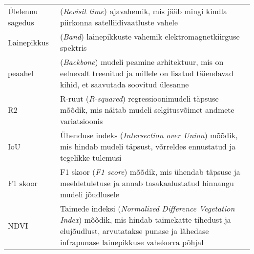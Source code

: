 \begin{longtable}{p{3cm}p{10cm}}  %
Ülelennu sagedus & (\textit{Revisit time}) ajavahemik, mis jääb mingi kindla
piirkonna satelliidivaatluste vahele\\
Lainepikkus & (\textit{Band}) lainepikkuste vahemik elektromagnetkiirguse spektris \\
peaahel & (\textit{Backbone}) mudeli peamine arhitektuur, mis on eelnevalt treenitud
ja millele on lisatud täiendavad kihid, et saavutada soovitud ülesanne\\
R2 & R-ruut (\textit{R-squared}) regressioonimudeli täpsuse mõõdik, mis näitab
mudeli selgitusvõimet andmete variatsioonis\\
IoU & Ühenduse indeks (\textit{Intersection over Union}) mõõdik, mis hindab
mudeli täpsust, võrreldes ennustatud ja tegelikke tulemusi\\
F1 skoor & F1 skoor (\textit{F1 score}) mõõdik, mis ühendab täpsuse ja
meeldetuletuse ja annab tasakaalustatud hinnangu mudeli jõudlusele\\
NDVI & Taimede indeksi (\textit{Normalized Difference Vegetation Index}) mõõdik, mis
hindab taimekatte tihedust ja elujõudlust, arvutatakse punase ja lähedase
infrapunase lainepikkuse vahekorra põhjal\\
\end{longtable}
\addtocounter{table}{-1} %